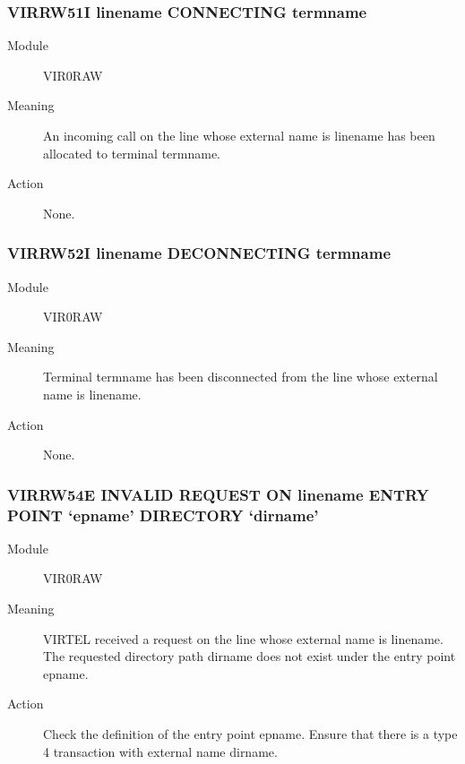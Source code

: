 \documentclass[letterpaper,10pt,english]{sphinxmanual}
\begin{document}
\subsubsection{VIRRW51I linename CONNECTING termname}
\label{\detokenize{messages:virrw51i-linename-connecting-termname}}\begin{description}
\item[{Module}] \leavevmode
VIR0RAW

\item[{Meaning}] \leavevmode
An incoming call on the line whose external name is linename has been allocated to terminal termname.

\item[{Action}] \leavevmode
None.

\end{description}


\subsubsection{VIRRW52I linename DECONNECTING termname}
\label{\detokenize{messages:virrw52i-linename-deconnecting-termname}}\begin{description}
\item[{Module}] \leavevmode
VIR0RAW

\item[{Meaning}] \leavevmode
Terminal termname has been disconnected from the line whose external name is linename.

\item[{Action}] \leavevmode
None.

\end{description}


\subsubsection{VIRRW54E INVALID REQUEST ON linename ENTRY POINT ‘epname’ DIRECTORY ‘dirname’}
\label{\detokenize{messages:virrw54e-invalid-request-on-linename-entry-point-epname-directory-dirname}}\begin{description}
\item[{Module}] \leavevmode
VIR0RAW

\item[{Meaning}] \leavevmode
VIRTEL received a request on the line whose external name is linename. The requested directory path dirname does not exist under the entry point epname.

\item[{Action}] \leavevmode
Check the definition of the entry point epname. Ensure that there is a type 4 transaction with external name dirname.

\end{description}
\end{document}
